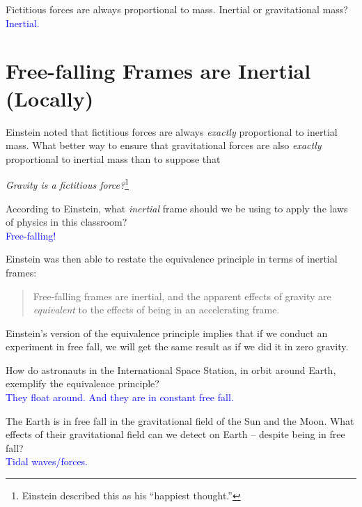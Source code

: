 \documentclass[11pt, letterpaper, openany]{book}
\newenvironment{exercise}[1][Exercise]{%
  \tcolorbox[blanker, breakable, left=1em,
    before skip=1em, after skip=1em,
    borderline west={3pt}{0pt}{PhysNavy},
    colback=PhysCream,
    before upper={\textcolor{PhysNavy}{\sffamily\bfseries #1:}\space}
  ]%
}{%
  \endtcolorbox%
}
\begin{document}
\begin{exercise}[Exercise 3]
Fictitious forces are always proportional to mass. Inertial or gravitational mass? \\
\textcolor{blue}{Inertial.}
\end{exercise}

\section*{Free-falling Frames are Inertial (Locally)}

Einstein noted that fictitious forces are always \textit{exactly} proportional to inertial mass. What better way to ensure that gravitational forces are also \textit{exactly} proportional to inertial mass than to suppose that

\begin{center}
\textit{Gravity is a fictitious force?}\footnote{Einstein described this as his ``happiest thought.''}
\end{center}

\begin{exercise}[Exercise 4]
According to Einstein, what \textit{inertial} frame should we be using to apply the laws of physics in this classroom? \\
\textcolor{blue}{Free-falling!}
\end{exercise}

Einstein was then able to restate the equivalence principle in terms of inertial frames:

\begin{quote}
Free-falling frames are inertial, and the apparent effects of gravity are \textit{equivalent} to the effects of being in an accelerating frame.
\end{quote}

Einstein's version of the equivalence principle implies that if we conduct an experiment in free fall, we will get the same result as if we did it in zero gravity.

\begin{exercise}[Exercise 5]
How do astronauts in the International Space Station, in orbit around Earth, exemplify the equivalence principle? \\
\textcolor{blue}{They float around. And they are in constant free fall.}
\end{exercise}

\begin{exercise}[Exercise 6]
The Earth is in free fall in the gravitational field of the Sun and the Moon. What effects of their gravitational field can we detect on Earth -- despite being in free fall? \\
\textcolor{blue}{Tidal waves/forces.}
\end{exercise}
\end{document}
